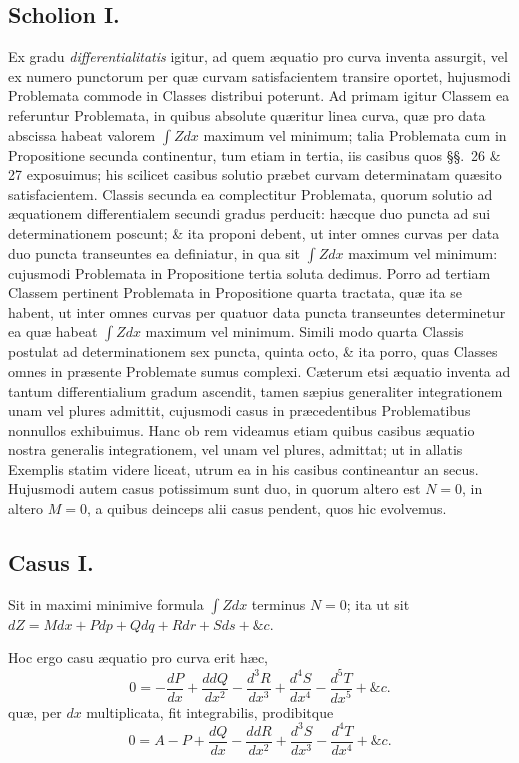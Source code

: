 \subsection*{Scholion I.}
Ex gradu \textit{differentialitatis} igitur, ad quem æquatio pro curva inventa assurgit, vel ex numero punctorum per quæ curvam satisfacientem transire oportet, hujusmodi Problemata commode in Classes distribui poterunt. Ad primam igitur Classem ea referuntur Problemata, in quibus absolute quæritur linea curva, quæ pro data abscissa habeat valorem $\int Zdx$ maximum vel minimum; talia Problemata cum in Propositione secunda continentur, tum etiam in tertia, iis casibus quos §§.~26 \& 27 exposuimus; his scilicet casibus solutio præbet curvam determinatam quæsito satisfacientem. Classis secunda ea complectitur Problemata, quorum solutio ad æquationem differentialem secundi gradus perducit: hæcque duo puncta ad sui determinationem poscunt; \& ita proponi debent, ut inter omnes curvas per data duo puncta transeuntes ea definiatur, in qua sit $\int Zdx$ maximum vel minimum: cujusmodi Problemata in Propositione tertia soluta dedimus. Porro ad tertiam Classem pertinent Problemata in Propositione quarta tractata, quæ ita se habent, ut inter omnes curvas per quatuor data puncta transeuntes determinetur ea quæ habeat $\int Zdx$ maximum vel minimum. Simili modo quarta Classis postulat ad determinationem sex puncta, quinta octo, \& ita porro, quas Classes omnes in præsente Problemate sumus complexi. Cæterum etsi æquatio inventa ad tantum differentialium gradum ascendit, tamen sæpius generaliter integrationem unam vel plures admittit, cujusmodi casus in præcedentibus Problematibus nonnullos exhibuimus. Hanc ob rem videamus etiam quibus casibus æquatio nostra generalis integrationem, vel unam vel plures, admittat; ut in allatis Exemplis statim videre liceat, utrum ea in his casibus contineantur an secus. Hujusmodi autem casus potissimum sunt duo, in quorum altero est $N=0$, in altero $M=0$, a quibus deinceps alii casus pendent, quos hic evolvemus.

\subsection*{Casus I.}
Sit in maximi minimive formula $\int Zdx$ terminus $N=0$; ita ut sit $dZ=Mdx+Pdp+Qdq+Rdr+Sds+\&c.$

Hoc ergo casu æquatio pro curva erit hæc,
\[0=-\frac{dP}{dx}+\frac{ddQ}{dx^2}-\frac{d^3R}{dx^3}+\frac{d^4S}{dx^4}-\frac{d^5T}{dx^5}+\&c.\]
quæ, per $dx$ multiplicata, fit integrabilis, prodibitque
\[0=A-P+\frac{dQ}{dx}-\frac{ddR}{dx^2}+\frac{d^3S}{dx^3}-\frac{d^4T}{dx^4}+\&c.\]


